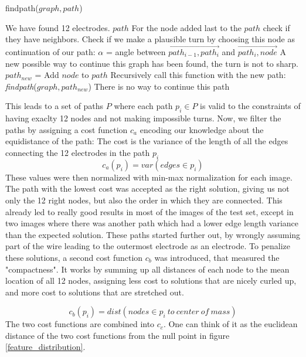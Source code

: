 \documentclass[a4paper, 11pt]{article}
\begin{document}
\begin{algorithm}[H]
	\caption{findpath($graph,path$)} 
	
	\begin{algorithmic}[1]
			 \State We have found 12 electrodes.
		\Return $path$
		\EndIf
		\State For the node added last to the $path$ check if they have neighbors.
				\State Check if we make a plausible turn by choosing this node as continuation of our path:
				\State $\alpha$ = angle between $\overrightarrow{path_{i-1}, path_i}$ and $\overrightarrow{path_i, node}$
					\State A new possible way to continue this graph has been found, the turn is not to sharp.
					\State $path_{new}$ = Add $node$ to $path$
					\State Recursively call this function with the new path:
					\State \emph{findpath}($graph,path_{new}$)
				\EndIf
		\EndFor
			\State There is no way to continue this path
			\Return
		\EndIf
		
	\end{algorithmic} 
\end{algorithm}

This leads to a set of paths $P$ where each path $p_i \in P$ is valid to the constraints of having exaclty 12 nodes and not making impossible turns. Now, we filter the paths by assigning a cost function $c_a$ encoding our knowledge about the equidistance of the path: The cost is the variance of the length of all the edges connecting the 12 electrodes in the path $p_i$
$$ c_a(p_i)=var(edges\in p_i)$$
These values were then normalized with min-max normalization for each image. The path with the lowest cost was accepted as the right solution, giving us not only the 12 right nodes, but also the order in which they are connected.
This already led to really good results in most of the images of the test set, except in two images where there was another path which had a lower edge length variance than the expected solution. These paths started further out, by wrongly assuming part of the wire leading to the outermost electrode as an electrode. To penalize these solutions, a second cost function $c_b$ was introduced, that measured the "compactness". It works by summing up all distances of each node to the mean location of all 12 nodes, assigning less cost to solutions that are nicely curled up, and more cost to solutions that are stretched out. 

$$ c_b(p_i)=dist (nodes \in p_i\ to\ center\ of\ mass)$$
The two cost functions are combined into $c_ {c}$. One can think of it as the euclidean distance of the two cost functions from the null point in figure \ref{feature_distribution}.
\end{document}
